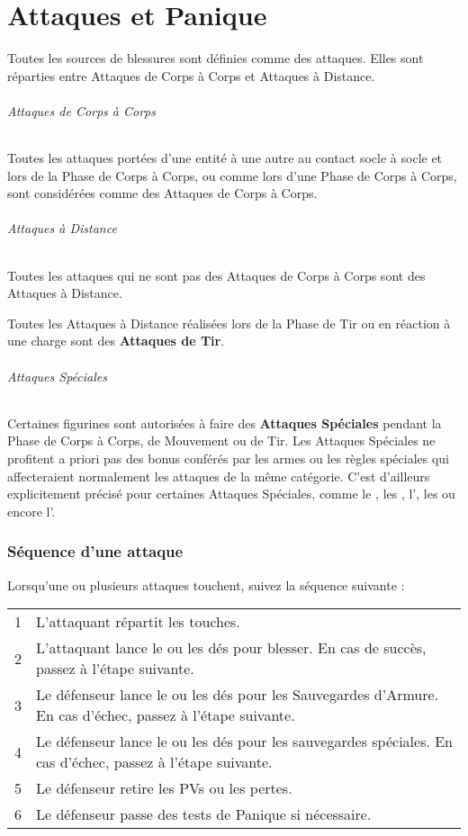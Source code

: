 
\part{Attaques et Panique}
\label{attacks_and_damage}

Toutes les sources de blessures sont définies comme des attaques. Elles sont réparties entre Attaques de Corps à Corps et Attaques à Distance.

\paragraph{Attaques de Corps à Corps}

Toutes les attaques portées d'une entité à une autre au contact socle à socle et lors de la Phase de Corps à Corps, ou comme lors d'une Phase de Corps à Corps, sont considérées comme des Attaques de Corps à Corps.

\paragraph{Attaques à Distance}

Toutes les attaques qui ne sont pas des Attaques de Corps à Corps sont des Attaques à Distance.

Toutes les Attaques à Distance réalisées lors de la Phase de Tir ou en réaction à une charge sont des \textbf{Attaques de Tir}.

\paragraph{Attaques Spéciales}

Certaines figurines sont autorisées à faire des \textbf{Attaques Spéciales} pendant la Phase de Corps à Corps, de Mouvement ou de Tir. Les Attaques Spéciales ne profitent a priori pas des bonus conférés par les armes ou les règles spéciales qui affecteraient normalement les attaques de la même catégorie. C'est d'ailleurs explicitement précisé pour certaines Attaques Spéciales, comme le \stomp{}, les \grindingattacks{}, l'\crushattack{}, les \impacthits{} ou encore l'\breathweapon{}.

\section{Séquence d'une attaque}

Lorsqu'une ou plusieurs attaques touchent, suivez la séquence suivante :

\hspace*{0.3cm}
\begin{tabular}{c|m{14cm}}
1 & L'attaquant répartit les touches. \tabularnewline
2 & L'attaquant lance le ou les dés pour blesser. En cas de succès, passez à l'étape suivante. \tabularnewline 
3 & Le défenseur lance le ou les dés pour les Sauvegardes d'Armure. En cas d'échec, passez à l'étape suivante. \tabularnewline
4 & Le défenseur lance le ou les dés pour les sauvegardes spéciales. En cas d'échec, passez à l'étape suivante. \tabularnewline
5 & Le défenseur retire les PVs ou les pertes. \tabularnewline
6 & Le défenseur passe des tests de Panique si nécessaire. \tabularnewline
\end{tabular}

